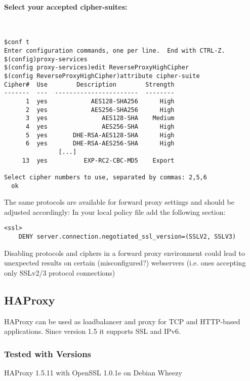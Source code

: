 \paragraph*{Select your accepted cipher-suites:}
~
\begin{lstlisting}
$conf t
Enter configuration commands, one per line.  End with CTRL-Z.
$(config)proxy-services
$(config proxy-services)edit ReverseProxyHighCipher
$(config ReverseProxyHighCipher)attribute cipher-suite
Cipher#  Use        Description        Strength
-------  ---  -----------------------  --------
      1  yes            AES128-SHA256      High
      2  yes            AES256-SHA256      High
      3  yes               AES128-SHA    Medium
      4  yes               AES256-SHA      High
      5  yes       DHE-RSA-AES128-SHA      High
      6  yes       DHE-RSA-AES256-SHA      High
               [...]
     13  yes          EXP-RC2-CBC-MD5    Export

Select cipher numbers to use, separated by commas: 2,5,6
  ok
\end{lstlisting}

The same protocols are available for forward proxy settings and should be adjusted accordingly:
In your local policy file add the following section:
\begin{lstlisting}
<ssl>
    DENY server.connection.negotiated_ssl_version=(SSLV2, SSLV3)
\end{lstlisting}

Disabling protocols and ciphers in a forward proxy environment could lead to unexpected results on certain (misconfigured?) webservers (i.e. ones accepting only SSLv2/3 protocol connections)


\subsection{HAProxy}

HAProxy can be used as loadbalancer and proxy for TCP and HTTP-based applications. Since version 1.5 it supports SSL and IPv6.

\subsubsection{Tested with Versions}
\begin{itemize*}
  \item HAProxy 1.5.11 with OpenSSL 1.0.1e on Debian Wheezy
\end{itemize*}

